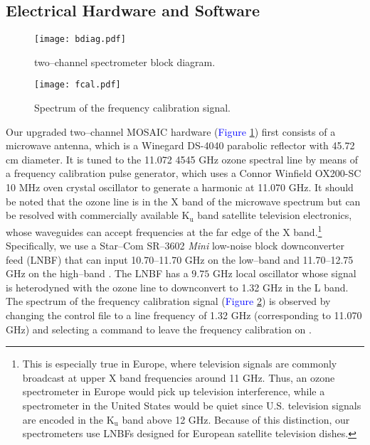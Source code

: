 \documentclass[11pt]{article}
\begin{document}
\subsection{Electrical Hardware and Software}	
	\begin{figure}[t]
		\centering
		\centerline{\texttt{[image: bdiag.pdf]}}
		\caption{two--channel spectrometer block diagram.}
		\label{bdiag}
	\end{figure}		
	\begin{figure}[t]
		\centering
		\texttt{[image: fcal.pdf]}
		\caption{Spectrum of the frequency calibration signal.}
		\label{fcal}
	\end{figure}
Our upgraded two--channel MOSAIC hardware (\textcolor{blue}{Figure} \ref{bdiag}) first consists of a microwave antenna, which is a Winegard DS-4040 parabolic reflector with 45.72 cm diameter. It is tuned to the 11.072 4545 GHz ozone spectral line by means of a frequency calibration pulse generator, which uses a Connor Winfield OX200-SC 10 MHz oven crystal oscillator to generate a harmonic at 11.070 GHz. It should be noted that the ozone line is in the X band of the microwave spectrum \cite{mbands} but can be resolved with commercially available $\text{K}_\text{u}$ band satellite television electronics, whose waveguides can accept frequencies at the far edge of the X band.\footnote{This is especially true in Europe, where television signals are commonly broadcast at upper X band frequencies around 11 GHz. Thus, an ozone spectrometer in Europe would pick up television interference, while a spectrometer in the United States would be quiet since U.S. television signals are encoded in the $\text{K}_\text{u}$ band above 12 GHz. Because of this distinction, our spectrometers use LNBFs designed for European satellite television dishes.} Specifically, we use a Star--Com SR--3602 \textit{Mini} low-noise block downconverter feed (LNBF) that can input 10.70--11.70 GHz on the low--band and 11.70--12.75 GHz on the high--band \cite{SR3602}. The LNBF has a $9.75$ GHz local oscillator whose signal is heterodyned with the ozone line to downconvert to 1.32 GHz in the L band. The spectrum of the frequency calibration signal (\textcolor{blue}{Figure} \ref{fcal}) is observed by changing the control file to a line frequency of 1.32 GHz (corresponding to 11.070 GHz) and selecting a command to leave the frequency calibration on \cite{VSRT77}. 
\end{document}
